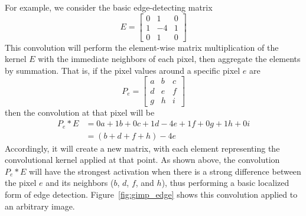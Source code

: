 For example, we consider the basic edge-detecting matrix 
\[E = \begin{bmatrix} 0 & 1 & 0 \\ 1 & -4 & 1 \\ 0 & 1 & 0\end{bmatrix}\]
This convolution will perform the element-wise matrix multiplication of the kernel $E$ with the immediate neighbors of each pixel, then aggregate the elements by summation.
That is, if the pixel values around a specific pixel $e$ are 
\[P_e = \begin{bmatrix} a & b & c \\ d & e & f \\ g & h & i\end{bmatrix}\]
then the convolution at that pixel will be
\begin{align*}
P_e * E &= 0a + 1b + 0c + 1d -4e + 1f + 0g+ 1h + 0i \\
&= (b + d + f + h) - 4e
\end{align*}
Accordingly, it will create a new matrix, with each element representing the convolutional kernel applied at that point.
As shown above, the convolution $P_e * E$ will have the strongest activation when there is a strong difference between the pixel $e$ and its neighbors ($b$, $d$, $f$, and $h$), thus performing a basic localized form of edge detection.
Figure~\ref{fig:gimp_edge} shows this convolution applied to an arbitrary image.


